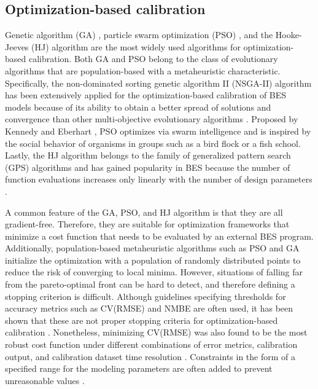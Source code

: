 \documentclass[review]{elsarticle}
\begin{document}
\subsection{Optimization-based calibration}

Genetic algorithm (GA) \cite{bandera2017towards, ramosruiz2017analysis, ramosruiz2016genetic, zuhaib2019application, martinez2020performance, martinez2020model, nagpal2019framework, tian2019investigation, chen2019meta}, particle swarm optimization (PSO) \cite{andrade-cabrera2017ensemble, yang2016automated, roberti2015calibrating, andrade-cabrera2019augmented, zhang2020development, Ha2020parameter, larochellemartin2019energy, ferrara2020optimizing, cacabelos2017development}, and the Hooke-Jeeves (HJ) algorithm \cite{li2018stepwise, abdelalim2017data, ogando2017energy, carlon2016on, cacabelos2017development} are the most widely used algorithms for optimization-based calibration. Both GA and PSO belong to the class of evolutionary algorithms that are population-based with a metaheuristic characteristic. Specifically, the non-dominated sorting genetic algorithm II (NSGA-II) algorithm has been extensively applied for the optimization-based calibration of BES models \cite{bandera2017towards, ramosruiz2017analysis, ramosruiz2016genetic, zuhaib2019application, martinez2020performance, martinez2020model} because of its ability to obtain a better spread of solutions and convergence than other multi-objective evolutionary algorithms \cite{deb2002fast}. Proposed by Kennedy and Eberhart \cite{kennedy1995particle}, PSO optimizes via swarm intelligence and is inspired by the social behavior of organisms in groups such as a bird flock or a fish school. Lastly, the HJ algorithm \cite{hooke1961direct} belongs to the family of generalized pattern search (GPS) algorithms and has gained popularity in BES because the number of function evaluations increases only linearly with the number of design parameters \cite{wetter2001genopt}.

A common feature of the GA, PSO, and HJ algorithm is that they are all gradient-free. Therefore, they are suitable for optimization frameworks that minimize a cost function that needs to be evaluated by an external BES program. Additionally, population-based metaheuristic algorithms such as PSO and GA initialize the optimization with a population of randomly distributed points to reduce the risk of converging to local minima. However, situations of falling far from the pareto-optimal front can be hard to detect, and therefore defining a stopping criterion is difficult. Although guidelines \cite{ashrae2014guideline, evo2012international, femp2015guidelines} specifying thresholds for accuracy metrics such as CV(RMSE) and NMBE are often used, it has been shown that these are not proper stopping criteria for optimization-based calibration \cite{martinez2020performance}. Nonetheless, minimizing CV(RMSE) was also found to be the most robust cost function under different combinations of error metrics, calibration output, and calibration dataset time resolution \cite{martinez2020performance}. Constraints in the form of a specified range for the modeling parameters are often added to prevent unreasonable values \cite{qiu2018quick}.  
\end{document}
